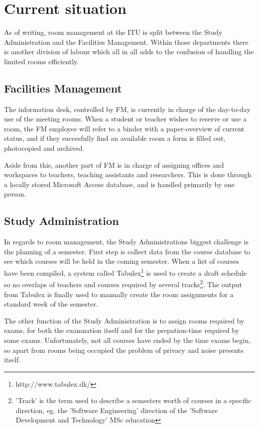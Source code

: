 \section{Current situation}
As of writing, room management at the ITU is split between the Study Administration and the Facilities Management. Within those departments there is another division of labour which all in all adds to the confusion of handling the limited rooms efficiently.

\subsection{Facilities Management}
The information desk, controlled by FM, is currently in charge of the day-to-day use of the meeting rooms. When a student or teacher wishes to reserve or use a room, the FM employee will refer to a binder with a paper-overview of current status, and if they succesfully find an available room a form is filled out, photocopied and archived.

Aside from this, another part of FM is in charge of assigning offices and workspaces to teachers, teaching assistants and researchers. This is done through a locally stored Microsoft Access database, and is handled primarily by one person.

\subsection{Study Administration}
In regards to room management, the Study Administrations biggest challenge is the planning of a semester. First step is collect data from the course database to see which courses will be held in the coming semester. When a list of courses have been compiled, a system called Tabulex\footnote{http://www.tabulex.dk/} is used to create a draft schedule so no overlaps of teachers and courses required by several tracks\footnote{'Track' is the term used to describe a semesters worth of courses in a specific direction, eg. the 'Software Engineering' direction of the 'Software Development and Technology' MSc education}. The output from Tabulex is finally used to manually create the room assignments for a standard week of the semester.

The other function of the Study Administration is to assign rooms required by exams, for both the examnation itself and for the prepation-time required by some exams. Unfortunately, not all courses have ended by the time exams begin, so apart from rooms being occupied the problem of privacy and noise presents itself.\\

